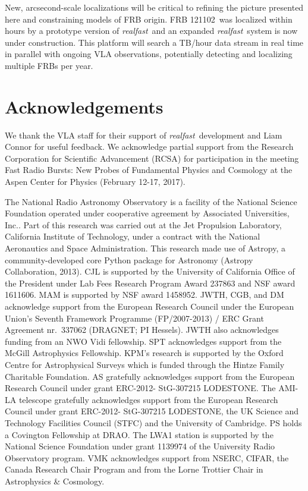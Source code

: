 \documentclass[twocolumn]{aastex61}
\newcommand{\rf}{\emph{realfast}}
\newcommand{\frb}{FRB 121102}
\begin{document}
New, arcsecond-scale localizations will be critical to refining the picture presented here and constraining models of FRB origin. \frb\ was localized within hours by a prototype version of \rf\ and an expanded \rf\ system is now under construction. This platform will search a TB/hour data stream in real time in parallel with ongoing VLA observations, potentially detecting and localizing multiple FRBs per year.



\section*{Acknowledgements}
We thank the VLA staff for their support of \rf\ development and Liam Connor for useful feedback. We acknowledge partial support from the Research Corporation for Scientific Advancement (RCSA) for participation in the meeting Fast Radio Bursts: New Probes of Fundamental Physics and Cosmology at the Aspen Center for Physics (February 12-17, 2017).

The National Radio Astronomy Observatory is a facility of the National Science Foundation operated under cooperative agreement by Associated Universities, Inc..
Part of this research was carried out at the Jet Propulsion Laboratory, California Institute of Technology, under a contract with the National Aeronautics and Space Administration.
This research made use of Astropy, a community-developed core Python package for Astronomy (Astropy Collaboration, 2013).
CJL is supported by the University of California Office of the President under Lab Fees Research Program Award 237863 and NSF award 1611606. MAM is supported by NSF award 1458952. 
JWTH, CGB, and DM acknowledge support from the European Research Council under the European Union's Seventh Framework Programme (FP/2007-2013) / ERC Grant Agreement nr.\ 337062 (DRAGNET; PI Hessels). JWTH also acknowledges funding from an NWO Vidi fellowship.
SPT acknowledges support from the McGill Astrophysics Fellowship.
KPM's research is supported by the Oxford Centre for Astrophysical Surveys which is funded through the Hintze Family Charitable Foundation. AS gratefully acknowledges support from the European Research Council under grant ERC-2012- StG-307215 LODESTONE. The AMI-LA telescope gratefully acknowledges support from the European Research Council under grant ERC-2012- StG-307215 LODESTONE, the UK Science and Technology Facilities Council (STFC) and the University of Cambridge. 
PS holds a Covington Fellowship at DRAO. 
The LWA1 station is supported by the National Science Foundation under grant 1139974 of the University Radio Observatory program.
VMK acknowledges support from NSERC, CIFAR, the Canada Research Chair Program and from the Lorne Trottier Chair in Astrophysics \& Cosmology.




\end{document}
